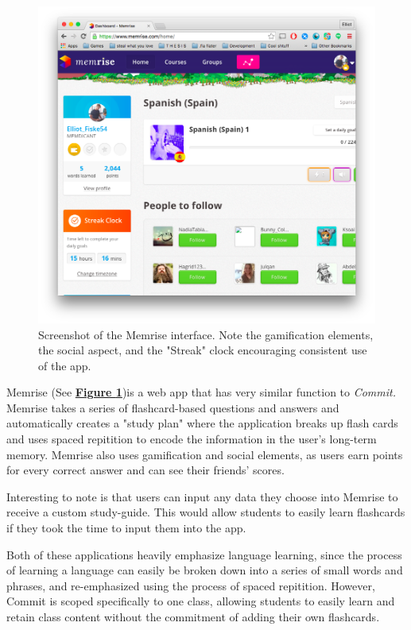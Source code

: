 \begin{figure}
	\centering
	\includegraphics[width=0.7\linewidth]{memrise}
	\caption[Memrise]{Screenshot of the Memrise interface. Note the gamification elements, the social aspect, and the "Streak" clock encouraging consistent use of the app.}
	\label{fig:memrise}
\end{figure}

\par Memrise (See \textbf{\hyperref[fig:memrise]{Figure \ref*{fig:memrise}}})is a web app that has very similar function to \textit{Commit.} Memrise takes a series of flashcard-based questions and answers and automatically creates a "study plan" where the application breaks up flash cards and uses spaced repitition to encode the information in the user's long-term memory. Memrise also uses gamification and social elements, as users earn points for every correct answer and can see their friends' scores.

\par Interesting to note is that users can input any data they choose into Memrise to receive a custom study-guide. This would allow students to easily learn flashcards if they took the time to input them into the app.

\par Both of these applications heavily emphasize language learning, since the process of learning a language can easily be broken down into a series of small words and phrases, and re-emphasized using the process of spaced repitition. However, Commit is scoped specifically to one class, allowing students to easily learn and retain class content without the commitment of adding their own flashcards.

